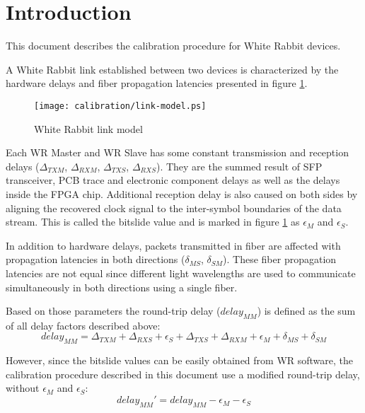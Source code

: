 \section{Introduction}

This document describes the calibration procedure for White Rabbit devices. 

A White Rabbit link established between two devices is characterized by the
hardware delays and fiber propagation latencies presented in figure
\ref{fig:intro:link-model}.

\begin{figure}[ht]
	\begin{center}
		\texttt{[image: calibration/link-model.ps]}
		\caption{White Rabbit link model}
		\label{fig:intro:link-model}
	\end{center}
\end{figure}

Each WR Master and WR Slave has some constant transmission and reception delays
($\Delta_{TXM}$, $\Delta_{RXM}$, $\Delta_{TXS}$, $\Delta_{RXS}$). They are the
summed result of SFP transceiver, PCB trace and electronic component
delays as well as the delays inside the FPGA chip. Additional reception delay is
also caused on both sides by aligning the recovered clock signal to the inter-symbol
boundaries of the data stream. This is called the bitslide value and is marked in figure
\ref{fig:intro:link-model} as $\epsilon_M$ and $\epsilon_S$.

In addition to hardware delays, packets transmitted in fiber are affected with
propagation latencies in both directions ($\delta_{MS}$, $\delta_{SM}$). These
fiber propagation latencies are not equal since different light wavelengths are 
used to communicate simultaneously in both directions using a single fiber.

Based on those parameters the round-trip delay ($delay_{MM}$) is defined as the
sum of all delay factors described above:
\begin{equation}
	delay_{MM} = \Delta_{TXM} + \Delta_{RXS} + \epsilon_S + \Delta_{TXS} +
	\Delta_{RXM} + \epsilon_M + \delta_{MS} + \delta_{SM}
\end{equation}

However, since the bitslide values can be easily obtained from WR software, 
the calibration procedure described in this document use a modified round-trip delay, 
without $\epsilon_M$ and $\epsilon_S$:
\begin{equation}
	delay_{MM}' = delay_{MM} - \epsilon_M - \epsilon_S
\end{equation}

